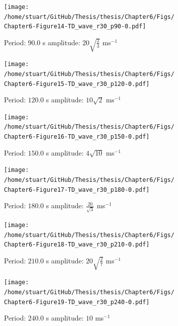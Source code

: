 \documentclass[a4paper,12pt,fourier,authoryear,custommargin]{Classes/PhDThesisPSnPDF}
\begin{document}
\begin{figure}
    \centering
\ContinuedFloat


    \begin{subfigure}[b]{0.79\columnwidth}
        \texttt{[image: /home/stuart/GitHub/Thesis/thesis/Chapter6/Figs/Chapter6-Figure14-TD\_wave\_r30\_p90-0.pdf]}
        \caption{Period: $90.0$ s amplitude: $20\sqrt{\frac{2}{3}}$ ms$^{{-1}}$}
        \label{fig:TD-wave-r30-p90-0}
    \end{subfigure}

    \begin{subfigure}[b]{0.79\columnwidth}
        \texttt{[image: /home/stuart/GitHub/Thesis/thesis/Chapter6/Figs/Chapter6-Figure15-TD\_wave\_r30\_p120-0.pdf]}
        \caption{Period: $120.0$ s amplitude: $10\sqrt{2}$ ms$^{{-1}}$}
        \label{fig:TD-wave-r30-p120-0}
    \end{subfigure}
    \caption{}
    \label{fig:TD-fwave-r30-c}
\end{figure}

\begin{figure}
    \centering
\ContinuedFloat


    \begin{subfigure}[b]{0.79\columnwidth}
        \texttt{[image: /home/stuart/GitHub/Thesis/thesis/Chapter6/Figs/Chapter6-Figure16-TD\_wave\_r30\_p150-0.pdf]}
        \caption{Period: $150.0$ s amplitude: $4\sqrt{10}$ ms$^{{-1}}$}
        \label{fig:TD-wave-r30-p150-0}
    \end{subfigure}

    \begin{subfigure}[b]{0.79\columnwidth}
        \texttt{[image: /home/stuart/GitHub/Thesis/thesis/Chapter6/Figs/Chapter6-Figure17-TD\_wave\_r30\_p180-0.pdf]}
        \caption{Period: $180.0$ s amplitude: $\frac{20}{\sqrt{3}}$ ms$^{{-1}}$}
        \label{fig:TD-wave-r30-p180-0}
    \end{subfigure}
    \caption{}
    \label{fig:TD-fwave-r30-c}
\end{figure}

\begin{figure}
    \centering
\ContinuedFloat


    \begin{subfigure}[b]{0.79\columnwidth}
        \texttt{[image: /home/stuart/GitHub/Thesis/thesis/Chapter6/Figs/Chapter6-Figure18-TD\_wave\_r30\_p210-0.pdf]}
        \caption{Period: $210.0$ s amplitude: $20\sqrt{\frac{2}{7}}$ ms$^{{-1}}$}
        \label{fig:TD-wave-r30-p210-0}
    \end{subfigure}

    \begin{subfigure}[b]{0.79\columnwidth}
        \texttt{[image: /home/stuart/GitHub/Thesis/thesis/Chapter6/Figs/Chapter6-Figure19-TD\_wave\_r30\_p240-0.pdf]}
        \caption{Period: $240.0$ s amplitude: $10$ ms$^{{-1}}$}
        \label{fig:TD-wave-r30-p240-0}
    \end{subfigure}
    \caption{}
    \label{fig:TD-fwave-r30-c}
\end{figure}
\end{document}
